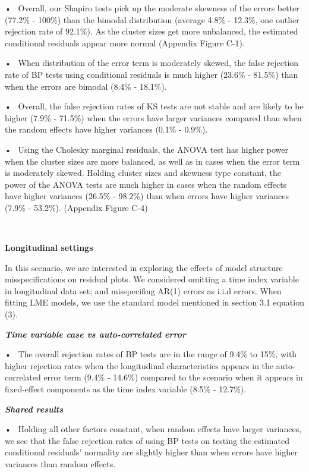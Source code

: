 \documentclass[12pt]{article}
\begin{document}
• ~Overall, our Shapiro tests pick up the moderate skewness of the
errors better (77.2\% - 100\%) than the bimodal distribution (average
4.8\% - 12.3\%, one outlier rejection rate of 92.1\%). As the cluster
sizes get more unbalanced, the estimated conditional residuals appear
more normal (Appendix Figure C-1).

• ~When distribution of the error term is moderately skewed, the false
rejection rate of BP tests using conditional residuals is much higher
(23.6\% - 81.5\%) than when the errors are bimodal (8.4\% - 18.1\%).

• ~Overall, the false rejection rates of KS tests are not stable and are
likely to be higher (7.9\% - 71.5\%) when the errors have larger
variances compared than when the random effects have higher variances
(0.1\% - 0.9\%).

• ~Using the Cholesky marginal residuals, the ANOVA test has higher
power when the cluster sizes are more balanced, as well as in cases when
the error term is moderately skewed. Holding cluster sizes and skewness
type constant, the power of the ANOVA tests are much higher in cases
when the random effects have higher variances (26.5\% - 98.2\%) than
when errors have higher variances (7.9\% - 53.2\%). (Appendix Figure
C-4)

~

\textbf{Longitudinal settings}

In this scenario, we are interested in exploring the effects of model
structure misspecifications on residual plots. We considered omitting a
time index variable in longitudinal data set; and misspecifing AR(1)
errors as i.i.d errors. When fitting LME models, we use the standard
model mentioned in section 3.1 equation (3).

\textbf{\emph{Time variable case vs auto-correlated error}}

• ~The overall rejection rates of BP tests are in the range of 9.4\% to
15\%, with higher rejection rates when the longitudinal characteristics
appears in the auto-correlated error term (9.4\% - 14.6\%) compared to
the scenario when it appears in fixed-effect components as the time
index variable (8.5\% - 12.7\%).

\textbf{\emph{Shared results}}

• ~Holding all other factors constant, when random effects have larger
variances, we see that the false rejection rates of using BP tests on
testing the estimated conditional residuals' normality are slightly
higher than when errors have higher variances than random effects.
\end{document}
